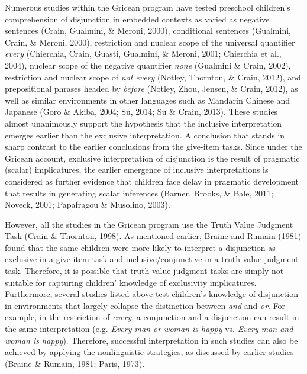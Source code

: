 \documentclass[floatsintext,man]{apa6}
\theoremstyle{definition}
\theoremstyle{definition}
\theoremstyle{definition}
\theoremstyle{remark}
\begin{document}
Numerous studies within the Gricean program have tested preschool
children's comprehension of disjunction in embedded contexts as varied
as negative sentences (Crain, Gualmini, \& Meroni, 2000), conditional
sentences (Gualmini, Crain, \& Meroni, 2000), restriction and nuclear
scope of the universal quantifier \emph{every} (Chierchia, Crain,
Guasti, Gualmini, \& Meroni, 2001; Chierchia et al., 2004), nuclear
scope of the negative quantifier \emph{none} (Gualmini \& Crain, 2002),
restriction and nuclear scope of \emph{not every} (Notley, Thornton, \&
Crain, 2012), and prepositional phrases headed by \emph{before} (Notley,
Zhou, Jensen, \& Crain, 2012), as well as similar environments in other
languages such as Mandarin Chinese and Japanese (Goro \& Akiba, 2004;
Su, 2014; Su \& Crain, 2013). These studies almost unanimously support
the hypothesis that the inclusive interpretation emerges earlier than
the exclusive interpretation. A conclusion that stands in sharp contrast
to the earlier conclusions from the give-item tasks. Since under the
Gricean account, exclusive interpretation of disjunction is the result
of pragmatic (scalar) implicatures, the earlier emergence of inclusive
interpretations is considered as further evidence that children face
delay in pragmatic development that results in generating scalar
inferences (Barner, Brooks, \& Bale, 2011; Noveck, 2001; Papafragou \&
Musolino, 2003).

However, all the studies in the Gricean program use the Truth Value
Judgment Task (Crain \& Thornton, 1998). As mentioned earlier, Braine
and Rumain (1981) found that the same children were more likely to
interpret a disjunction as exclusive in a give-item task and
inclusive/conjunctive in a truth value judgment task. Therefore, it is
possible that truth value judgment tasks are simply not suitable for
capturing children' knowledge of exclusivity implicatures. Furthermore,
several studies listed above test children's knowledge of disjunction in
environments that largely collapse the distinction between \emph{and}
and \emph{or}. For example, in the restriction of \emph{every}, a
conjunction and a disjunction can result in the same interpretation
(e.g. \emph{Every man or woman is happy} vs. \emph{Every man and woman
is happy}). Therefore, successful interpretation in such studies can
also be achieved by applying the nonlinguistic strategies, as discussed
by earlier studies (Braine \& Rumain, 1981; Paris, 1973).
\end{document}
